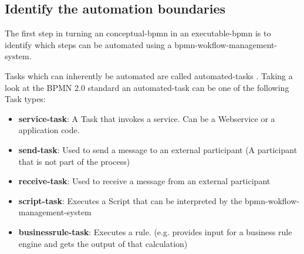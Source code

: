 \subsection{Identify the automation boundaries}
The first step in turning an \gls{conceptual-bpmn} in an  \gls{executable-bpmn} is to identify which steps can be automated using a \gls{bpmn-wokflow-management-system}. 

Tasks which can inherently be automated are called \gls{automated-task}s \cite[p.~317]{fundamentals}. Taking a look at the BPMN 2.0 standard an \gls{automated-task} can be one of the following Task types:
\begin{itemize}
	\item \textbf{\gls{service-task}}: A Task that invokes a service. Can be a Webservice or a application code.
	\item \textbf{\gls{send-task}}: Used to send a message to an external participant (A participant that is not part of the process)
	\item \textbf{\gls{receive-task}}: Used to receive a message from an external participant
	\item \textbf{\gls{script-task}}: Executes a Script that can be interpreted by the \gls{bpmn-wokflow-management-system}
	\item \textbf{\gls{businessrule-task}}: Executes a rule. (e.g. provides input for a business rule engine and gets the output of that calculation)
\end{itemize}

